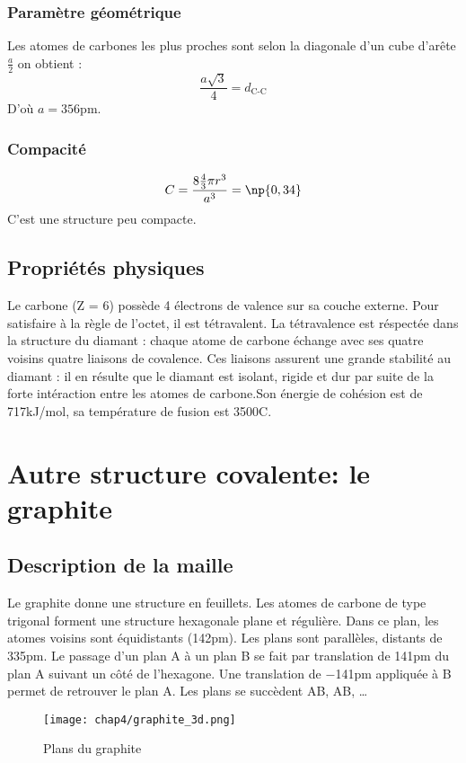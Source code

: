 \subsubsection{Paramètre géométrique}
Les atomes de carbones les plus proches sont selon la diagonale d’un cube d’arête
$\frac{a}{2}$ on obtient :
\begin{equation}
    \frac{a\sqrt{3}}{4} = d_\text{C-C}
\end{equation}
D'où $a = 356$pm.

\subsubsection{Compacité}
\begin{equation}
    C = \frac{8\frac{4}{3}\pi r^3}{a^3} = \np{0,34}
\end{equation}
C'est une structure peu compacte.


\subsection{Propriétés physiques}
Le carbone (Z = 6) possède 4 électrons de valence sur sa couche externe. Pour
satisfaire à la règle de l’octet, il est tétravalent. La tétravalence est réspectée dans la structure
du diamant : chaque atome de carbone échange avec ses quatre voisins quatre liaisons
de covalence. Ces liaisons assurent une grande stabilité au diamant : il en résulte que
le diamant est isolant, rigide et dur par suite de la forte intéraction entre les atomes de
carbone.Son énergie 
de cohésion est de 717kJ/mol, sa température 
de fusion est 3500\degre C.


\section{Autre structure covalente: le graphite}
\subsection{Description de la maille}
Le graphite donne une structure en feuillets. Les atomes de carbone de type trigonal
forment une structure hexagonale plane et régulière. Dans ce plan, les atomes voisins
sont équidistants (142pm). Les plans sont parallèles, distants de 335pm. Le passage
d’un plan A à un plan B se fait par translation de 141pm du plan A suivant un côté de
l’hexagone. Une translation de $-$141pm appliquée à B permet de retrouver le plan A.
Les plans se succèdent AB, AB, \dots
\begin{figure}
    \centering
    \texttt{[image: chap4/graphite\_3d.png]}
    \caption{Plans du graphite}\label{fig:4_graphite_3d}
\end{figure}

